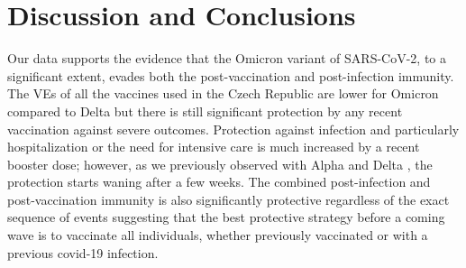 \documentclass[preprint,12pt,authoryear]{elsarticle}
\begin{document}



\section{Discussion and Conclusions}
\label{sec4}

Our data supports the evidence that the Omicron variant of SARS-CoV-2,  to a significant extent, evades both the post-vaccination and post-infection immunity. The VEs of all the vaccines used in the Czech Republic are lower for Omicron compared to Delta but there is still significant protection by any recent vaccination against severe outcomes. Protection against infection and particularly hospitalization or the need for intensive care is much increased by a recent booster dose; however, as we previously observed with Alpha and Delta \citep{Berec2021preprint}, the protection starts waning after a few weeks. The combined post-infection and post-vaccination immunity is also significantly protective regardless of the exact sequence of events suggesting that the best protective strategy before a coming wave is to vaccinate all individuals, whether previously vaccinated or with a previous covid-19 infection.
\end{document}
